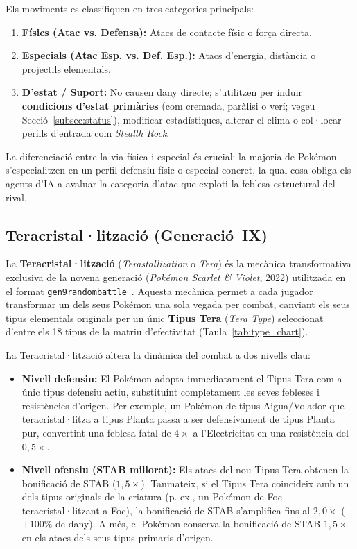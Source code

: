 Els moviments es classifiquen en tres categories principals:
\begin{enumerate}
    \item \textbf{Físics (Atac vs. Defensa):} Atacs de contacte físic o força directa.
    \item \textbf{Especials (Atac Esp. vs. Def. Esp.):} Atacs d'energia, distància o projectils elementals.
    \item \textbf{D'estat / Suport:} No causen dany directe; s'utilitzen per induir \textbf{condicions d'estat primàries} (com cremada, paràlisi o verí; vegeu Secció~\ref{subsec:status}), modificar estadístiques, alterar el clima o col·locar perills d'entrada com \emph{Stealth Rock}.
\end{enumerate}

La diferenciació entre la via física i especial és crucial: la majoria de Pokémon s'especialitzen en un perfil defensiu físic o especial concret, la qual cosa obliga els agents d'IA a avaluar la categoria d'atac que exploti la feblesa estructural del rival.



\subsection{Teracristal·lització (Generació~IX)}
\label{subsec:teracristallitzacio}

La \textbf{Teracristal·lització} (\emph{Terastallization} o \emph{Tera}) és la mecànica transformativa exclusiva de la novena generació (\emph{Pokémon Scarlet \& Violet}, 2022) utilitzada en el format \texttt{gen9randombattle}~\cite{bulbapedia}. Aquesta mecànica permet a cada jugador transformar un dels seus Pokémon una sola vegada per combat, canviant els seus tipus elementals originals per un únic \textbf{Tipus Tera} (\emph{Tera Type}) seleccionat d'entre els 18 tipus de la matriu d'efectivitat (Taula~\ref{tab:type_chart}).

La Teracristal·lització altera la dinàmica del combat a dos nivells clau:
\begin{itemize}
    \item \textbf{Nivell defensiu:} El Pokémon adopta immediatament el Tipus Tera com a únic tipus defensiu actiu, substituint completament les seves febleses i resistències d'origen. Per exemple, un Pokémon de tipus Aigua/Volador que teracristal·litza a tipus Planta passa a ser defensivament de tipus Planta pur, convertint una feblesa fatal de $4\times$ a l'Electricitat en una resistència del $0{,}5\times$.
    \item \textbf{Nivell ofensiu (STAB millorat):} Els atacs del nou Tipus Tera obtenen la bonificació de STAB ($1{,}5\times$). Tanmateix, si el Tipus Tera coincideix amb un dels tipus originals de la criatura (p. ex., un Pokémon de Foc teracristal·litzant a Foc), la bonificació de STAB s'amplifica fins al \textbf{$2{,}0\times$} ($+100\%$ de dany). A més, el Pokémon conserva la bonificació de STAB $1{,}5\times$ en els atacs dels seus tipus primaris d'origen.
\end{itemize}

